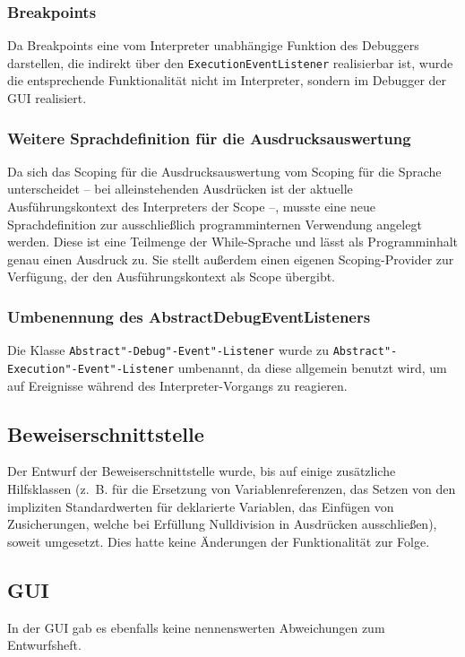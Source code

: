 \subsubsection{Breakpoints\label{aenderung_interpreter_breakpoints}}
Da Breakpoints eine vom Interpreter unabhängige Funktion des Debuggers darstellen, die indirekt über den \texttt{ExecutionEventListener} realisierbar ist, wurde die entsprechende Funktionalität nicht im Interpreter, sondern im Debugger der GUI realisiert.

\subsubsection{Weitere Sprachdefinition für die Ausdrucksauswertung}
Da sich das Scoping für die Ausdrucksauswertung vom Scoping für die Sprache unterscheidet -- bei alleinstehenden Ausdrücken ist der aktuelle Ausführungskontext des Interpreters der Scope --, musste eine neue Sprachdefinition zur ausschließlich programminternen Verwendung angelegt werden. Diese ist eine Teilmenge der While-Sprache und lässt als Programminhalt genau einen Ausdruck zu. Sie stellt außerdem einen eigenen Scoping-Provider zur Verfügung, der den Ausführungskontext als Scope übergibt.

\subsubsection{Umbenennung des AbstractDebugEventListeners}
Die Klasse \texttt{Abstract"-Debug"-Event"-Listener} wurde zu \texttt{Abstract"-Execution"-Event"-Listener} umbenannt, da diese allgemein benutzt wird, um auf Ereignisse während des Interpreter-Vorgangs zu reagieren.

\subsection{Beweiserschnittstelle}
Der Entwurf der Beweiserschnittstelle wurde, bis auf einige zusätzliche Hilfsklassen (z.~B. für die Ersetzung von Variablenreferenzen, das Setzen von den impliziten Standardwerten für deklarierte Variablen, das Einfügen von Zusicherungen, welche bei Erfüllung Nulldivision in Ausdrücken ausschließen), soweit umgesetzt. Dies hatte keine Änderungen der Funktionalität zur Folge.

\subsection{GUI}
In der GUI gab es ebenfalls keine nennenswerten Abweichungen zum Entwurfsheft.
